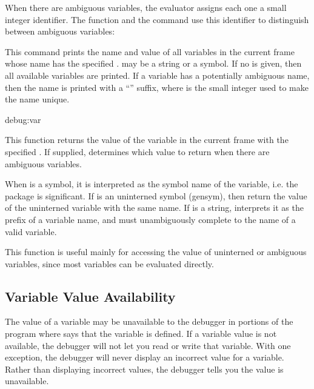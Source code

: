 When there are ambiguous variables, the evaluator assigns each one a
small integer identifier.  The  function and the
 command use this identifier to distinguish between
ambiguous variables:
\begin{Lentry}

\item[\code{list-locals} \mopt{\var{prefix}}]%
This command prints the name and value of all variables in the current
frame whose name has the specified .   may be a
string or a symbol.  If no  is given, then all available
variables are printed.  If a variable has a potentially ambiguous name,
then the name is printed with a ``\code{\#}'' suffix, where
 is the small integer used to make the name unique.
\end{Lentry}

\begin{defun}{debug:}{var}{}
  
  This function returns the value of the variable in the current frame
  with the specified .  If supplied, 
  determines which value to return when there are ambiguous variables.
  
  When  is a symbol, it is interpreted as the symbol name of
  the variable, i.e. the package is significant.  If  is an
  uninterned symbol (gensym), then return the value of the uninterned
  variable with the same name.  If  is a string,
   interprets it as the prefix of a variable name, and
  must unambiguously complete to the name of a valid variable.
  
  This function is useful mainly for accessing the value of uninterned
  or ambiguous variables, since most variables can be evaluated
  directly.
\end{defun}


\subsection{Variable Value Availability}
\label{debug-var-validity}

The value of a variable may be unavailable to the debugger in portions of the
program where \clisp{} says that the variable is defined.  If a variable value is
not available, the debugger will not let you read or write that variable.  With
one exception, the debugger will never display an incorrect value for a
variable.  Rather than displaying incorrect values, the debugger tells you the
value is unavailable.


